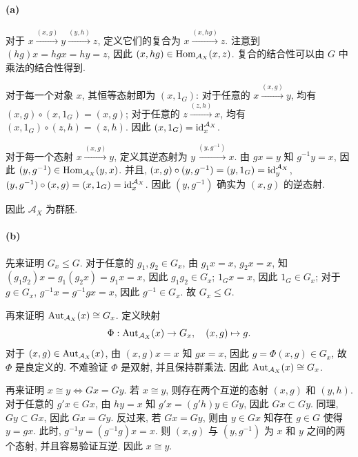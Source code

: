 \documentclass{article}
\begin{document}
\begin{solution}
	\paragraph{(a)} 对于 $x \xrightarrow{(x,g)} y \xrightarrow{(y,h)} z$, 定义它们的复合为 $x \xrightarrow{(x,hg)} z$. 注意到 $(hg)x = hgx = hy = z$, 因此 $(x,hg) \in \operatorname{Hom}_{\mathcal{A}_X}(x,z)$. 复合的结合性可以由 $G$ 中乘法的结合性得到.

	对于每一个对象 $x$, 其恒等态射即为 $(x, 1_G)$: 对于任意的 $x \xrightarrow{(x,g)} y$, 均有 $(x, g) \circ (x, 1_G) = (x, g)$; 对于任意的 $z \xrightarrow{(z,h)} x$, 均有 $(x, 1_G) \circ (z, h) = (z, h)$. 因此 $(x,1_G) = \operatorname{id}_x^{\mathcal{A}_X}$. 

	对于每一个态射 $x \xrightarrow{(x,g)} y$, 定义其逆态射为 $y \xrightarrow{(y,g^{-1})} x$. 由 $gx = y$ 知 $g^{-1}y = x$, 因此 $(y, g^{-1}) \in \operatorname{Hom}_{\mathcal{A}_X}(y,x)$. 并且, $(x,g) \circ (y, g^{-1}) = (y,1_G) = \operatorname{id}_y^{\mathcal{A}_X}$, $(y, g^{-1}) \circ (x, g) = (x, 1_G) = \operatorname{id}_{x}^{\mathcal{A}_X}$. 因此 $(y, g^{-1})$ 确实为 $(x, g)$ 的逆态射. 

	因此 $\mathcal{A}_X$ 为群胚.

	\paragraph{(b)} 先来证明 $G_x \le G$. 对于任意的 $g_1, g_2 \in G_x$, 由 $g_1x = x$, $g_2x = x$, 知 $(g_1g_2)x = g_1(g_2x) = g_1x = x$, 因此 $g_1g_2 \in G_x$; $1_G x = x$, 因此 $1_G \in G_x$; 对于 $g \in G_x$, $g^{-1}x = g^{-1}gx = x$, 因此 $g^{-1} \in G_x$. 故 $G_x \le G$. 

	再来证明 $\operatorname{Aut}_{\mathcal{A}_X}(x) \cong G_x$. 定义映射 
	\[ \Phi: \operatorname{Aut}_{\mathcal{A}_X}(x) \to G_x, \quad (x,g) \mapsto g. \]
	对于 $(x,g) \in \operatorname{Aut}_{\mathcal{A}_X}(x)$, 由 $(x,g)x = x$ 知 $gx = x$, 因此 $g = \Phi(x,g) \in G_x$, 故 $\Phi$ 是良定义的. 不难验证 $\Phi$ 是双射, 并且保持群乘法. 因此 $\operatorname{Aut}_{\mathcal{A}_X}(x) \cong G_x$. 

	再来证明 $x \cong y \Leftrightarrow Gx = Gy$. 若 $x \cong y$, 则存在两个互逆的态射 $(x,g)$ 和 $(y,h)$. 对于任意的 $g'x \in Gx$, 由 $hy = x$ 知 $g'x = (g'h)y \in Gy$, 因此 $Gx \subset Gy$. 同理, $Gy \subset Gx$, 因此 $Gx = Gy$. 反过来, 若 $Gx = Gy$, 则由 $y \in Gx$ 知存在 $g \in G$ 使得 $y = gx$. 此时, $g^{-1}y = (g^{-1}g)x = x$. 则 $(x,g)$ 与 $(y,g^{-1})$ 为 $x$ 和 $y$ 之间的两个态射, 并且容易验证互逆. 因此 $x \cong y$.
\end{solution}
\end{document}
